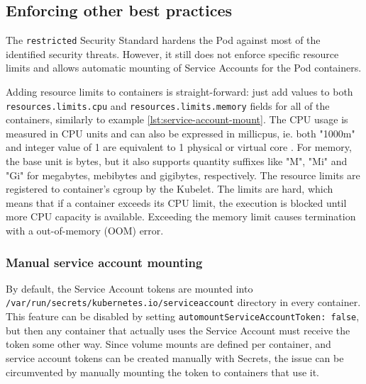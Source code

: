 \documentclass[english, 12pt, a4paper, sci, utf8, a-2b, online]{aaltothesis}
\begin{document}

\subsection{Enforcing other best practices}

The \texttt{restricted} Security Standard hardens the Pod against most of the identified security threats. However, it still does not enforce specific resource limits and allows automatic mounting of Service Accounts for the Pod containers.

Adding resource limits to containers is straight-forward: just add values to both \texttt{resources.limits.cpu} and \texttt{resources.limits.memory} fields for all of the containers, similarly to example \ref{lst:service-account-mount}. The CPU usage is measured in CPU units and can also be expressed in millicpus, ie. both "1000m" and integer value of 1 are equivalent to 1 physical or virtual core \cite{k8s-docs-resources}. For memory, the base unit is bytes, but it also supports quantity suffixes like "M", "Mi" and "Gi" for megabytes, mebibytes and gigibytes, respectively. The resource limits are registered to container's cgroup by the Kubelet. The limits are hard, which means that if a container exceeds its CPU limit, the execution is blocked until more CPU capacity is available. Exceeding the memory limit causes termination with a out-of-memory (OOM) error.

\subsubsection{Manual service account mounting}

By default, the Service Account tokens are mounted into \texttt{/var/run/secrets/kubernetes.io/serviceaccount} directory in every container. This feature can be disabled by setting \texttt{automountServiceAccountToken: false}, but then any container that actually uses the Service Account must receive the token some other way. Since volume mounts are defined per container, and service account tokens can be created manually with Secrets, the issue can be circumvented by manually mounting the token to containers that use it.
\end{document}
